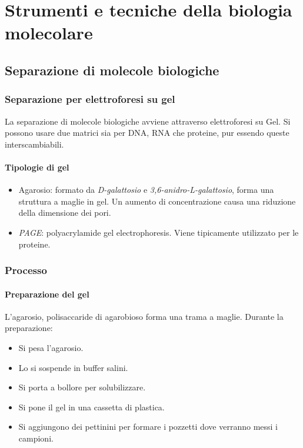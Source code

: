 \chapter{Strumenti e tecniche della biologia molecolare}

\section{Separazione di molecole biologiche}

	\subsection{Separazione per elettroforesi su gel}
	La separazione di molecole biologiche avviene attraverso elettroforesi su Gel.
	Si possono usare due matrici sia per DNA, RNA che proteine, pur essendo queste interscambiabili.

		\subsubsection{Tipologie di gel}
		\begin{multicols}{2}
			\begin{itemize}
				\item Agarosio: formato da \emph{D-galattosio} e \emph{3,6-anidro-L-galattosio}, forma una struttura a maglie in gel.
					Un aumento di concentrazione causa una riduzione della dimensione dei pori.
				\item \emph{PAGE}: polyacrylamide gel electrophoresis.
					Viene tipicamente utilizzato per le proteine.
			\end{itemize}
		\end{multicols}

	\subsection{Processo}

		\subsubsection{Preparazione del gel}
		L'agarosio, polisaccaride di agarobioso forma una trama a maglie.
		Durante la preparazione:
		\begin{multicols}{2}
			\begin{itemize}
				\item Si pesa l'agarosio.
				\item Lo si sospende in buffer salini.
				\item Si porta a bollore per solubilizzare.
				\item Si pone il gel in una cassetta di plastica.
				\item Si aggiungono dei pettinini per formare i pozzetti dove verranno messi i campioni.
			\end{itemize}
		\end{multicols}

